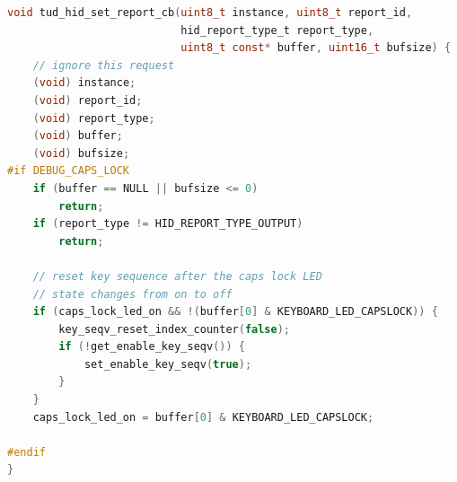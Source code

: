 \begin{lstlisting}[caption={A snippet of code which implements the payload re-execution.},
                   label={lst:usb_debug},
                   language=c]
void tud_hid_set_report_cb(uint8_t instance, uint8_t report_id,
                           hid_report_type_t report_type,
                           uint8_t const* buffer, uint16_t bufsize) {
    // ignore this request
    (void) instance;
    (void) report_id;
    (void) report_type;
    (void) buffer;
    (void) bufsize;
#if DEBUG_CAPS_LOCK
    if (buffer == NULL || bufsize <= 0)
        return;
    if (report_type != HID_REPORT_TYPE_OUTPUT)
        return;

    // reset key sequence after the caps lock LED
    // state changes from on to off
    if (caps_lock_led_on && !(buffer[0] & KEYBOARD_LED_CAPSLOCK)) {
        key_seqv_reset_index_counter(false);
        if (!get_enable_key_seqv()) {
            set_enable_key_seqv(true);
        }
    }
    caps_lock_led_on = buffer[0] & KEYBOARD_LED_CAPSLOCK;

#endif
}
\end{lstlisting}

